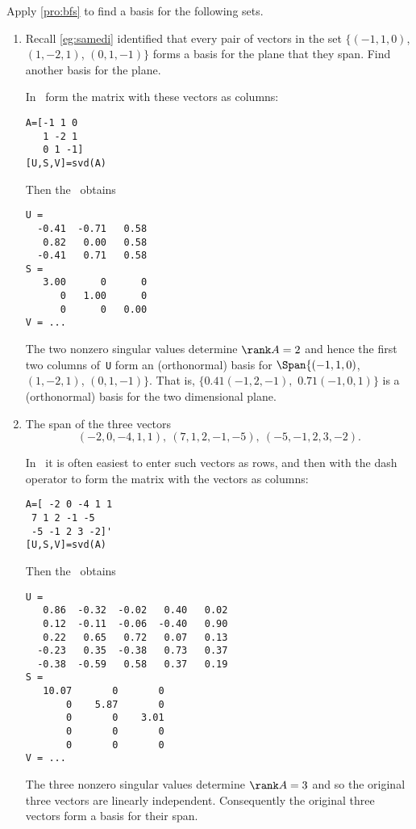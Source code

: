 \begin{example} 
Apply \cref{pro:bfs} to find a basis for the following sets.
\begin{enumerate}
\item Recall \cref{eg:samedi} identified that every pair of vectors in the set \(\{(-1,1,0)\), \((1,-2,1)\), \((0,1,-1)\}\) forms a basis for the plane that they span.  
Find another basis for the plane.
\begin{solution} 
In \script\ form the matrix with these vectors as columns:
\begin{verbatim}
A=[-1 1 0
   1 -2 1
   0 1 -1]
[U,S,V]=svd(A)
\end{verbatim}
\setbox\ajrqrbox\hbox{}%
\marginajrbox%
Then the \svd\  obtains \twodp
\begin{verbatim}
U =
  -0.41  -0.71   0.58
   0.82   0.00   0.58
  -0.41   0.71   0.58
S =
   3.00      0      0
      0   1.00      0
      0      0   0.00
V = ...
\end{verbatim}
The two nonzero singular values determine \(\rank A=2\) and hence the first two columns of~\verb|U| form an (orthonormal) basis for \(\Span\{(-1,1,0)\), \((1,-2,1)\), \((0,1,-1)\}\).
That is, \(\{0.41(-1,2,-1),\) \(0.71(-1,0,1)\}\) is a (orthonormal) basis for the two dimensional plane.
\end{solution}

\item The span of the three vectors
\begin{equation*}
(-2,0,-4,1,1),\ 
(7,1,2,-1,-5),\ 
(-5,-1,2,3,-2).
\end{equation*}
\begin{solution} 
In \script\ it is often easiest to enter such vectors as rows, and then  with the dash operator to form the matrix with the vectors as columns:
\begin{verbatim}
A=[ -2 0 -4 1 1
 7 1 2 -1 -5
 -5 -1 2 3 -2]'
[U,S,V]=svd(A)
\end{verbatim}
\setbox\ajrqrbox\hbox{}%
\marginajrbox%
Then the \svd\ obtains \twodp
\begin{verbatim}
U =
   0.86  -0.32  -0.02   0.40   0.02
   0.12  -0.11  -0.06  -0.40   0.90
   0.22   0.65   0.72   0.07   0.13
  -0.23   0.35  -0.38   0.73   0.37
  -0.38  -0.59   0.58   0.37   0.19
S =
   10.07       0       0
       0    5.87       0
       0       0    3.01
       0       0       0
       0       0       0
V = ...
\end{verbatim}
The three nonzero singular values determine  \(\rank A=3\) and so the original three vectors are linearly independent.
Consequently the original three vectors form a basis for their span.


\end{solution}
\end{enumerate}
\end{example}

